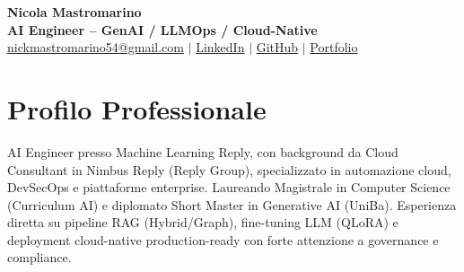 \documentclass[a4paper,10pt]{article}
\begin{document}
\pagestyle{empty}

\begin{center}
    {\Large\bfseries\color{blue!80!black} Nicola Mastromarino}\\[0.12em]
    {\normalsize\textbf{AI Engineer -- GenAI / LLMOps / Cloud-Native}}\\[0.18em]
    \href{mailto:nickmastromarino54@gmail.com}{nickmastromarino54@gmail.com} $\mid$
    \href{https://www.linkedin.com/in/nicola-mastromarino-3a3b74189}{LinkedIn} $\mid$
    \href{https://github.com/NicolaM99}{GitHub} $\mid$
    \href{https://nicolam99.github.io/}{Portfolio}
\end{center}

\vspace{-0.9em}
\section{Profilo Professionale}
AI Engineer presso Machine Learning Reply, con background da Cloud Consultant in Nimbus Reply (Reply Group), specializzato in automazione cloud, DevSecOps e piattaforme enterprise. Laureando Magistrale in Computer Science (Curriculum AI) e diplomato Short Master in Generative AI (UniBa). Esperienza diretta su pipeline RAG (Hybrid/Graph), fine-tuning LLM (QLoRA) e deployment cloud-native production-ready con forte attenzione a governance e compliance.
\end{document}
